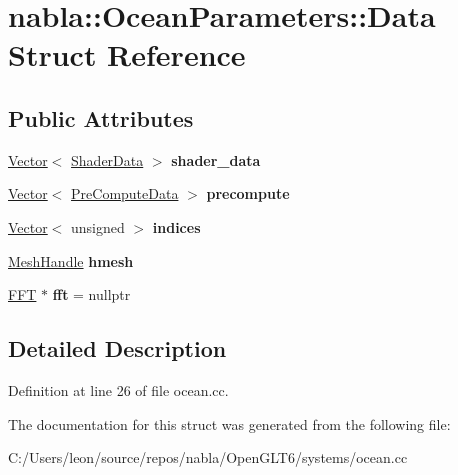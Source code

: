 \hypertarget{structnabla_1_1_ocean_parameters_1_1_data}{}\section{nabla\+::Ocean\+Parameters\+::Data Struct Reference}
\label{structnabla_1_1_ocean_parameters_1_1_data}
\subsection*{Public Attributes}
\begin{DoxyCompactItemize}
\item 
\mbox{\label{structnabla_1_1_ocean_parameters_1_1_data_a7f94b7a109dd840972d6bdbbe0286d77}} 
\mbox{\hyperlink{classnabla_1_1_s_t_l_vector_ex}{Vector}}$<$ \mbox{\hyperlink{structnabla_1_1renderer_1_1_shader_data}{Shader\+Data}} $>$ {\bfseries shader\+\_\+data}
\item 
\mbox{\label{structnabla_1_1_ocean_parameters_1_1_data_a94c2c169dd03537611b3320689288637}} 
\mbox{\hyperlink{classnabla_1_1_s_t_l_vector_ex}{Vector}}$<$ \mbox{\hyperlink{structnabla_1_1_pre_compute_data}{Pre\+Compute\+Data}} $>$ {\bfseries precompute}
\item 
\mbox{\label{structnabla_1_1_ocean_parameters_1_1_data_af81cd3515edc31583c2cc5da26a749c5}} 
\mbox{\hyperlink{classnabla_1_1_s_t_l_vector_ex}{Vector}}$<$ unsigned $>$ {\bfseries indices}
\item 
\mbox{\label{structnabla_1_1_ocean_parameters_1_1_data_a97c6d6af0d0abca43a0d8bf710e21283}} 
\mbox{\hyperlink{classnabla_1_1renderer_1_1_handle}{Mesh\+Handle}} {\bfseries hmesh}
\item 
\mbox{\label{structnabla_1_1_ocean_parameters_1_1_data_abe0b94562f80542aa0fff9d841d229ff}} 
\mbox{\hyperlink{class_f_f_t}{F\+FT}} $\ast$ {\bfseries fft} = nullptr
\end{DoxyCompactItemize}


\subsection{Detailed Description}


Definition at line 26 of file ocean.\+cc.



The documentation for this struct was generated from the following file\+:\begin{DoxyCompactItemize}
\item 
C\+:/\+Users/leon/source/repos/nabla/\+Open\+G\+L\+T6/systems/ocean.\+cc\end{DoxyCompactItemize}
